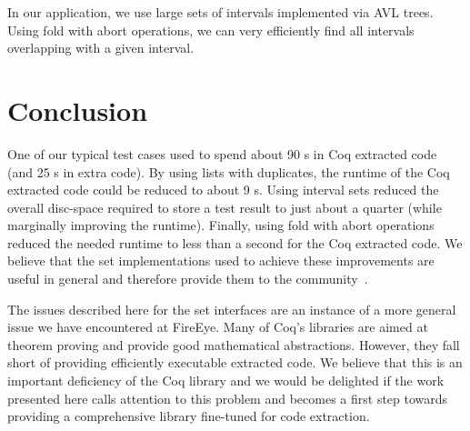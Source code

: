 \documentclass[a4paper,10pt,oneside]{article}
\begin{document}
In our application, we use large sets of intervals implemented via AVL
trees. Using fold with abort operations, we can very efficiently find
all intervals overlapping with a given interval.


\section{Conclusion}

One of our typical test cases used to spend about 90 s in Coq
extracted code (and 25 s in extra code).  By using lists with
duplicates, the runtime of the Coq extracted code could be reduced to
about 9 s. Using interval sets reduced the overall disc-space required
to store a test result to just about a quarter (while marginally
improving the runtime).  Finally, using fold with abort operations
reduced the needed runtime to less than a second for the Coq extracted
code. We believe that the set implementations used to achieve these
improvements are useful in general and therefore provide them to the
community~\cite{fireeye-coq-sets}.

The issues described here for the set interfaces are an instance of a more
general issue we have encountered at FireEye. Many of Coq's libraries
are aimed at theorem proving and provide good mathematical
abstractions. However, they fall short of providing efficiently
executable extracted code. We believe that this is an important
deficiency of the Coq library and we would be delighted if the work
presented here calls attention to this problem and becomes a first
step towards providing a comprehensive library fine-tuned for code
extraction.



 
\end{document}
